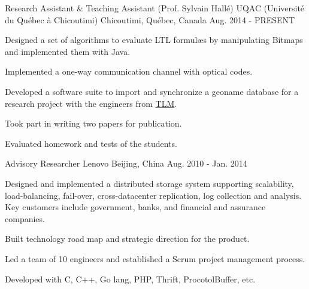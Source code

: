 


\begin{cventries}

  \cventry
    {Research Assistant \& Teaching Assistant (Prof. Sylvain Hallé)} %
    {UQAC (Université du Québec à Chicoutimi)} %
    {Chicoutimi, Québec, Canada} %
    {Aug. 2014 - PRESENT} %
    {
      \begin{cvitems} %
        \item {Designed a set of algorithms to evaluate LTL formul\ae{}s by manipulating Bitmaps and implemented them with Java.}
        \item {Implemented a one-way communication channel with optical codes.}
        \item {Developed a software suite to import and synchronize a geoname database for a research project with the engineers from \href{http://solutionstlm.com/}{TLM}.}
        \item {Took part in writing two papers for publication.}
        \item {Evaluated homework and tests of the students.}
      \end{cvitems}
    }

  \cventry
    {Advisory Researcher} %
    {Lenovo} %
    {Beijing, China} %
    {Aug. 2010 - Jan. 2014} %
    {
      \begin{cvitems} %
        \item {Designed and implemented a distributed storage system supporting scalability, load-balancing, fail-over, cross-datacenter replication, log collection and analysis. Key customers include government, banks, and financial and assurance companies.}
        \item {Built technology road map and strategic direction for the product.}
        \item {Led a team of 10 engineers and established a Scrum project management process.}
        \item {Developed with C, C++, Go lang, PHP, Thrift, ProcotolBuffer, etc.}
      \end{cvitems}
    }


\end{cventries}

